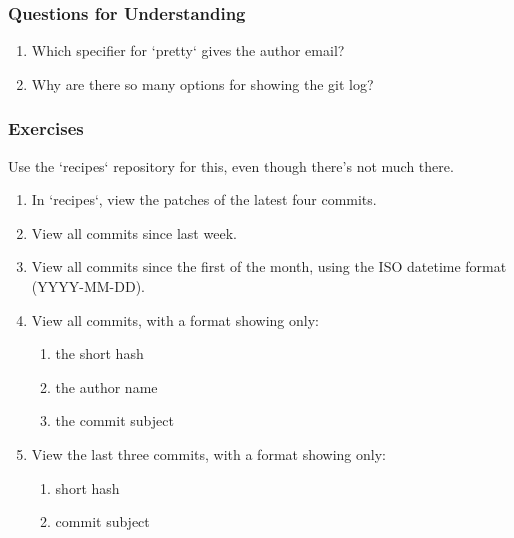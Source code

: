 \subsubsection{Questions for Understanding}
\begin{enumerate}
    \item Which specifier for `pretty` gives the author email?
    \item Why are there so many options for showing the git log?
\end{enumerate}


\subsubsection{Exercises}
Use the `recipes` repository for this, even though there's not much
there.
\begin{enumerate}
    \item In `recipes`, view the patches of the latest four commits.
    \item View all commits since last week.
    \item View all commits since the first of the month, using the ISO
       datetime format (YYYY-MM-DD).
    \item View all commits, with a format showing only:
    \begin{enumerate}
       \item the short hash
       \item the author name
       \item the commit subject
    \end{enumerate}
    \item View the last three commits, with a format showing only:
    \begin{enumerate}
       \item short hash
       \item commit subject
    \end{enumerate}
\end{enumerate}
